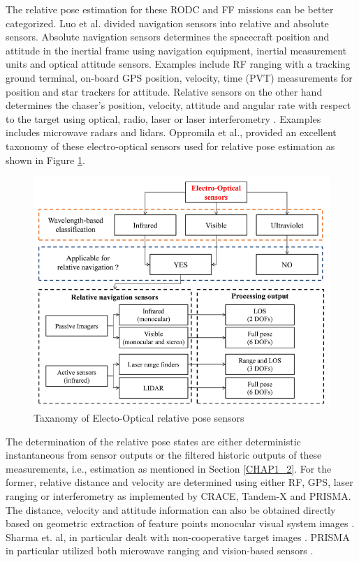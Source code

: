 The relative pose estimation for these RODC and FF missions can be better categorized. Luo et al. \cite{luoSurvey13} divided navigation sensors into relative and absolute sensors. Absolute navigation sensors determines the spacecraft position and attitude in the inertial frame using navigation equipment, inertial measurement units and optical attitude sensors. Examples include RF ranging with a tracking ground terminal, on-board GPS position, velocity, time (PVT) measurements for position and star trackers for attitude. Relative sensors on the other hand determines the chaser's position, velocity, attitude and angular rate with respect to the target using optical, radio, laser or laser interferometry \cite{yangInterSatelliteGrace13}. Examples includes microwave radars and lidars. 
Oppromila et al.\cite{OpromollaPose17}, provided an excellent taxonomy of these electro-optical sensors used for relative pose estimation as shown in Figure \ref{fig:taxonomyEo}. 
\begin{figure}[ht]
    \centering
    \includegraphics[width=1\textwidth]{Figures/OppromolaTaxanomyPoseSensors.PNG}
    \caption{Taxanomy of Electo-Optical relative pose sensors \cite{OpromollaPose17}}
    \label{fig:taxonomyEo}
\end{figure}
The determination of the relative pose states are either deterministic instantaneous from sensor outputs or the filtered historic outputs of these measurements, i.e., estimation as mentioned in Section \ref{CHAP1_2}. For the former, relative distance and velocity are determined using either RF, GPS, laser ranging or interferometry as implemented by CRACE, Tandem-X and PRISMA. The distance, velocity and attitude information can also be obtained directly based on geometric extraction of feature points monocular visual system images \cite{aghiliPoseVision10, leiPoseSlam19, sharmePoseNonC17a, ShijieMono10}. Sharma et. al, in particular  dealt with non-cooperative target images \cite{sharmePoseNonC17a}. PRISMA in particular utilized both microwave ranging and vision-based sensors \cite{monterbruckPrismaIsr08}.

